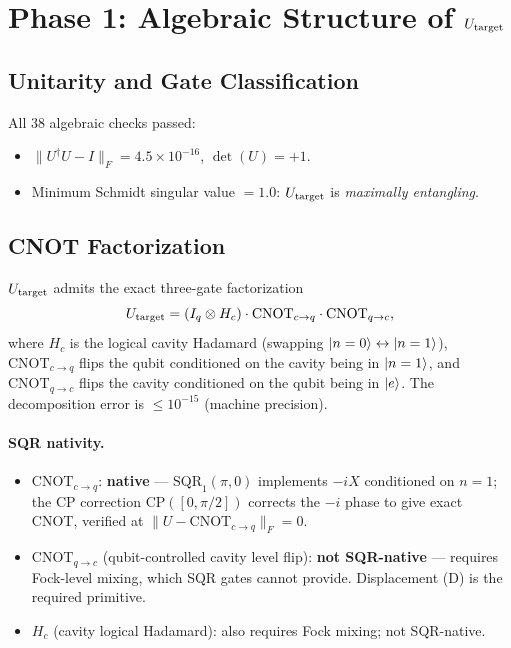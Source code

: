 \documentclass[11pt,a4paper]{article}
\newcommand{\Utarget}{U_{\rm target}}
\newcommand{\SQR}{\mathrm{SQR}}
\newcommand{\disp}{\mathrm{D}}
\begin{document}
\section{Phase 1: Algebraic Structure of \texorpdfstring{$\Utarget$}{U\_target}}

\subsection{Unitarity and Gate Classification}

All 38 algebraic checks passed:
\begin{itemize}
  \item $\|U^\dagger U - I\|_F = 4.5\times10^{-16}$, $\det(U)=+1$.
  \item Minimum Schmidt singular value $= 1.0$: $\Utarget$ is \emph{maximally entangling}.
\end{itemize}

\subsection{CNOT Factorization}

$\Utarget$ admits the exact three-gate factorization
\begin{equation}
  \Utarget = (I_q \otimes H_c)\cdot \mathrm{CNOT}_{c\to q}\cdot \mathrm{CNOT}_{q\to c},
  \label{eq:factorization}
\end{equation}
where $H_c$ is the logical cavity Hadamard (swapping $\ket{n=0}\leftrightarrow\ket{n=1}$),
$\mathrm{CNOT}_{c\to q}$ flips the qubit conditioned on the cavity being in $\ket{n=1}$,
and $\mathrm{CNOT}_{q\to c}$ flips the cavity conditioned on the qubit being in $\ket{e}$.
The decomposition error is $\leq 10^{-15}$ (machine precision).

\paragraph{SQR nativity.}
\begin{itemize}
  \item $\mathrm{CNOT}_{c\to q}$: \textbf{native} — $\SQR_1(\pi,0)$ implements
        $-iX$ conditioned on $n=1$; the CP correction
        $\text{CP}([0,\pi/2])$ corrects the $-i$ phase to give exact CNOT,
        verified at $\|U-\mathrm{CNOT}_{c\to q}\|_F = 0$.
  \item $\mathrm{CNOT}_{q\to c}$ (qubit-controlled cavity level flip):
        \textbf{not SQR-native} — requires Fock-level mixing, which SQR gates cannot
        provide.  Displacement ($\disp$) is the required primitive.
  \item $H_c$ (cavity logical Hadamard): also requires Fock mixing; not SQR-native.
\end{itemize}
\end{document}
